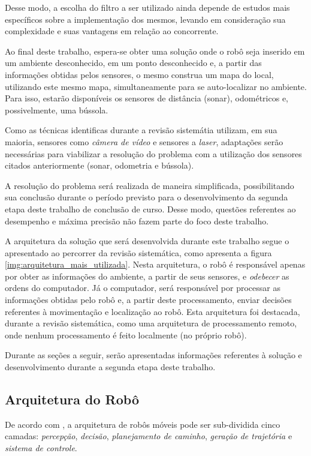 	Desse modo, a escolha do filtro a ser utilizado ainda depende de estudos mais específicos sobre a implementação dos mesmos, levando em consideração sua complexidade e suas vantagens em relação ao concorrente.

	Ao final deste trabalho, espera-se obter uma solução onde o robô seja inserido em um ambiente desconhecido, em um ponto desconhecido e, a partir das informações obtidas pelos sensores, o mesmo construa um mapa do local, utilizando este mesmo mapa, simultaneamente para se auto-localizar no ambiente. Para isso, estarão disponíveis os sensores de distância (sonar), odométricos e, possivelmente, uma bússola.

	Como as técnicas identificas durante a revisão sistemátia utilizam, em sua maioria, sensores como \textit{câmera de vídeo} e sensores a \textit{laser}, adaptações serão necessárias para viabilizar a resolução do problema com a utilização dos sensores citados anteriormente (sonar, odometria e bússola).

	A resolução do problema será realizada de maneira simplificada, possibilitando sua conclusão durante o período previsto para o desenvolvimento da segunda etapa deste trabalho de conclusão de curso. Desse modo, questões referentes ao desempenho e máxima precisão não fazem parte do foco deste trabalho.

	A arquitetura da solução que será desenvolvida durante este trabalho segue o apresentado ao percorrer da revisão sistemática, como apresenta a figura \ref{img:arquitetura_mais_utilizada}. Nesta arquitetura, o robô é responsável apenas por obter as informações do ambiente, a partir de seus sensores, e \textit{odebecer} as ordens do computador. Já o computador, será responsável por processar as informações obtidas pelo robô e, a partir deste processamento, enviar decisões referentes à movimentação e localização ao robô. Esta arquitetura foi destacada, durante a revisão sistemática, como uma arquitetura de processamento remoto, onde nenhum processamento é feito localmente (no próprio robô).

	Durante as seções a seguir, serão apresentadas informações referentes à solução e desenvolvimento durante a segunda etapa deste trabalho.

	\subsection{Arquitetura do Robô} %
	\label{sub:arquitetura_do_robô}
		
		De acordo com \cite{vieira}, a arquitetura de robôs móveis pode ser sub-dividida cinco camadas: \textit{percepção}, \textit{decisão}, \textit{planejamento de caminho}, \textit{geração de trajetória} e \textit{sistema de controle}.

